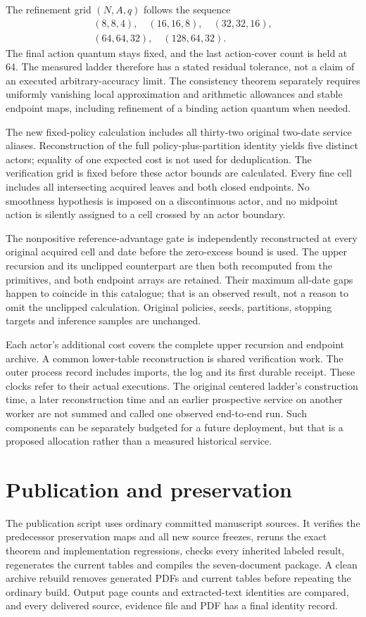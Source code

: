 The refinement grid $(N,A,q)$ follows the sequence
\begin{gather*}
(8,8,4),\quad(16,16,8),\quad(32,32,16),\\
(64,64,32),\quad(128,64,32).
\end{gather*}
 The final action quantum stays fixed, and the last action-cover count is held at 64. The measured ladder therefore has a stated residual tolerance, not a claim of an executed arbitrary-accuracy limit. The consistency theorem separately requires uniformly vanishing local approximation and arithmetic allowances and stable endpoint maps, including refinement of a binding action quantum when needed.

The new fixed-policy calculation includes all thirty-two original two-date service aliases. Reconstruction of the full policy-plus-partition identity yields five distinct actors; equality of one expected cost is not used for deduplication. The verification grid is fixed before these actor bounds are calculated. Every fine cell includes all intersecting acquired leaves and both closed endpoints. No smoothness hypothesis is imposed on a discontinuous actor, and no midpoint action is silently assigned to a cell crossed by an actor boundary.

The nonpositive reference-advantage gate is independently reconstructed at every original acquired cell and date before the zero-excess bound is used. The upper recursion and its unclipped counterpart are then both recomputed from the primitives, and both endpoint arrays are retained. Their maximum all-date gaps happen to coincide in this catalogue; that is an observed result, not a reason to omit the unclipped calculation. Original policies, seeds, partitions, stopping targets and inference samples are unchanged.

Each actor's additional cost covers the complete upper recursion and endpoint archive. A common lower-table reconstruction is shared verification work. The outer process record includes imports, the log and its first durable receipt. These clocks refer to their actual executions. The original centered ladder's construction time, a later reconstruction time and an earlier prospective service on another worker are not summed and called one observed end-to-end run. Such components can be separately budgeted for a future deployment, but that is a proposed allocation rather than a measured historical service.

\section{Publication and preservation}\label{supp:publication61}
The publication script uses ordinary committed manuscript sources. It verifies the predecessor preservation maps and all new source freezes, reruns the exact theorem and implementation regressions, checks every inherited labeled result, regenerates the current tables and compiles the seven-document package. A clean archive rebuild removes generated PDFs and current tables before repeating the ordinary build. Output page counts and extracted-text identities are compared, and every delivered source, evidence file and PDF has a final identity record.

